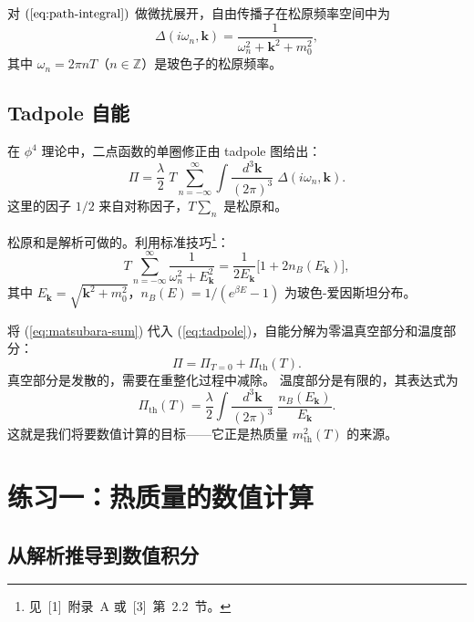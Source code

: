 \documentclass[12pt,a4paper]{article}
\begin{document}
对 $(\ref{eq:path-integral})$ 做微扰展开，自由传播子在松原频率空间中为
\begin{equation}
\Delta(i\omega_n, \mathbf{k}) = \frac{1}{\omega_n^2 + \mathbf{k}^2 + m_0^2},
\label{eq:propagator}
\end{equation}
其中 $\omega_n = 2\pi n T$（$n \in \mathbb{Z}$）是玻色子的松原频率。

\subsection{Tadpole 自能}

在 $\phi^4$ 理论中，二点函数的单圈修正由 tadpole 图给出：
\begin{equation}
\Pi = \frac{\lambda}{2}\; T\sum_{n=-\infty}^{\infty} \int \frac{d^3\mathbf{k}}{(2\pi)^3}\; \Delta(i\omega_n, \mathbf{k}).
\label{eq:tadpole}
\end{equation}
这里的因子 $1/2$ 来自对称因子，$T\sum_n$ 是松原和。

松原和是解析可做的。利用标准技巧\footnote{见~[1]~附录~A 或~[3]~第~2.2~节。}：
\begin{equation}
T\sum_{n=-\infty}^{\infty} \frac{1}{\omega_n^2 + E_{\mathbf{k}}^2}
= \frac{1}{2E_{\mathbf{k}}}\bigl[1 + 2n_B(E_{\mathbf{k}})\bigr],
\label{eq:matsubara-sum}
\end{equation}
其中 $E_{\mathbf{k}} = \sqrt{\mathbf{k}^2 + m_0^2}$，$n_B(E) = 1/(e^{\beta E} - 1)$
为玻色-爱因斯坦分布。

将 (\ref{eq:matsubara-sum}) 代入 (\ref{eq:tadpole})，自能分解为零温真空部分和温度部分：
\begin{equation}
\Pi = \Pi_{T=0} + \Pi_{\text{th}}(T).
\label{eq:pi-split}
\end{equation}
真空部分是发散的，需要在重整化过程中减除。
温度部分是有限的，其表达式为
\begin{equation}
\Pi_{\text{th}}(T) = \frac{\lambda}{2} \int \frac{d^3\mathbf{k}}{(2\pi)^3}\; \frac{n_B(E_{\mathbf{k}})}{E_{\mathbf{k}}}.
\label{eq:pi-th}
\end{equation}
这就是我们将要数值计算的目标——它正是热质量 $m_{\text{th}}^2(T)$ 的来源。

\section{练习一：热质量的数值计算}

\subsection{从解析推导到数值积分}
\end{document}

